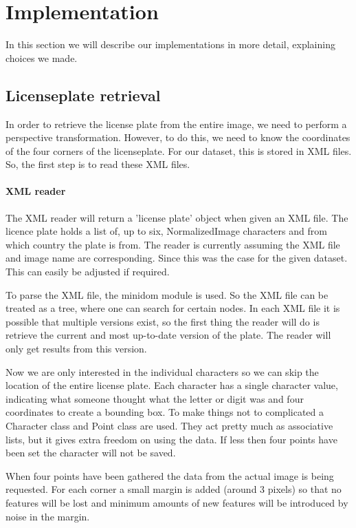\documentclass[a4paper]{article}
\begin{document}
\section{Implementation}

In this section we will describe our implementations in more detail, explaining
choices we made.

\subsection{Licenseplate retrieval}

In order to retrieve the license plate from the entire image, we need to
perform a perspective transformation. However, to do this, we need to know the 
coordinates of the four corners of the licenseplate. For our dataset, this is
stored in XML files. So, the first step is to read these XML files.

\paragraph*{XML reader}

The XML reader will return a 'license plate' object when given an XML file. The
licence plate holds a list of, up to six, NormalizedImage characters and from which country the
plate is from. The reader is currently assuming the XML file and image name are corresponding. Since this was the case
for the given dataset. This can easily be adjusted if required. 

To parse the XML file, the minidom module is used. So the XML file can be
treated as a tree, where one can search for certain nodes. In each XML
file it is possible that multiple versions exist, so the first thing the reader will do is
retrieve the current and most up-to-date version of the plate. The reader will only get results from this
version.

Now we are only interested in the individual characters so we can skip the location
of the entire license plate. Each character has 
a single character value, indicating what someone thought what the letter or digit was and four coordinates to create
a bounding box. To make things not to complicated a 
Character class and Point class are used. They
act pretty much as associative lists, but it gives extra freedom on using the
data. If less then four points have been set the character will not be saved.

When four points have been gathered the data from the actual image is being requested. 
For each corner a small margin is added (around 3 pixels) so that no features will be lost and minimum
amounts of new features will be introduced by noise in the margin. 
\end{document}
